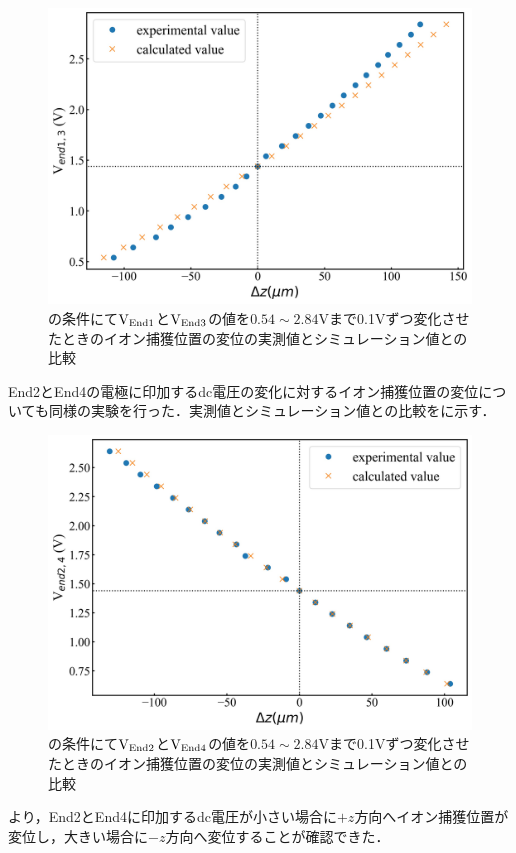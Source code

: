 \begin{figure}[h]
	\begin{center}
		\includegraphics[width = 0.6\linewidth]{./results/figure/out_V13.jpg}
		\caption{の条件にて${\rm V}_{\rm End1}$と${\rm V}_{\rm End3}$の値を$0.54 \sim 2.84$Vまで0.1Vずつ変化させたときのイオン捕獲位置の変位の実測値とシミュレーション値との比較}
		\label{fig:sim_exp_displacement_End13}
	\end{center}
\end{figure}

End2とEnd4の電極に印加するdc電圧の変化に対するイオン捕獲位置の変位についても同様の実験を行った．実測値とシミュレーション値との比較をに示す．

\begin{figure}[h]
	\begin{center}
		\includegraphics[width = 0.6\linewidth]{./results/figure/out_V24.jpg}
		\caption{の条件にて${\rm V}_{\rm End2}$と${\rm V}_{\rm End4}$の値を$0.54 \sim 2.84$Vまで0.1Vずつ変化させたときのイオン捕獲位置の変位の実測値とシミュレーション値との比較}
			\label{fig:sim_exp_displacement_End24}
	\end{center}
\end{figure}
より，End2とEnd4に印加するdc電圧が小さい場合に$+z$方向へイオン捕獲位置が変位し，大きい場合に$-z$方向へ変位することが確認できた．

